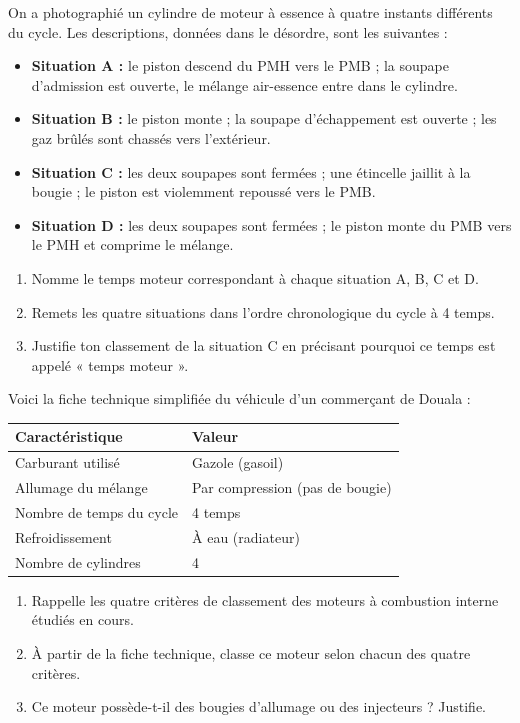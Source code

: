 \documentclass[11pt]{article}
\begin{document}
\begin{exercice}
On a photographié un cylindre de moteur à essence à quatre instants différents du cycle. Les descriptions, données dans le désordre, sont les suivantes :
\begin{itemize}
\item \textbf{Situation A :} le piston descend du PMH vers le PMB ; la soupape d'admission est ouverte, le mélange air-essence entre dans le cylindre.
\item \textbf{Situation B :} le piston monte ; la soupape d'échappement est ouverte ; les gaz brûlés sont chassés vers l'extérieur.
\item \textbf{Situation C :} les deux soupapes sont fermées ; une étincelle jaillit à la bougie ; le piston est violemment repoussé vers le PMB.
\item \textbf{Situation D :} les deux soupapes sont fermées ; le piston monte du PMB vers le PMH et comprime le mélange.
\end{itemize}
\begin{enumerate}
\item Nomme le temps moteur correspondant à chaque situation A, B, C et D.
\item Remets les quatre situations dans l'ordre chronologique du cycle à 4 temps.
\item Justifie ton classement de la situation C en précisant pourquoi ce temps est appelé « temps moteur ».
\end{enumerate}
\end{exercice}

\begin{exercice}
Voici la fiche technique simplifiée du véhicule d'un commerçant de Douala :

\begin{center}
\begin{tabularx}{\linewidth}{|l|X|}
\hline
\rowcolor{popblueL} Caractéristique & Valeur \\
\hline
Carburant utilisé & Gazole (gasoil) \\
\hline
Allumage du mélange & Par compression (pas de bougie) \\
\hline
Nombre de temps du cycle & 4 temps \\
\hline
Refroidissement & À eau (radiateur) \\
\hline
Nombre de cylindres & 4 \\
\hline
\end{tabularx}
\end{center}

\begin{enumerate}
\item Rappelle les quatre critères de classement des moteurs à combustion interne étudiés en cours.
\item À partir de la fiche technique, classe ce moteur selon chacun des quatre critères.
\item Ce moteur possède-t-il des bougies d'allumage ou des injecteurs ? Justifie.
\end{enumerate}
\end{exercice}
\end{document}
